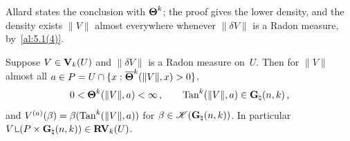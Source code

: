 \begin{remark}
    \label{rem:5.4}
    Allard states the conclusion with $\boldsymbol{\Theta}^{k}$; the proof gives the lower density, and
    the density exists $\|V\|$ almost everywhere whenever $\|\delta V\|$ is a Radon measure,
    by~\ref{al:5.1(4)}.
\end{remark}

\begin{theorem}
    \label{al:5.5(1)}
    Suppose $V \in \mathbf{V}_{k}(U)$ and $\|\delta V\|$ is a Radon measure on~$U$. Then for $\|V\|$
    almost all $a \in P = U \cap \{ x : \boldsymbol{\overline{\Theta}}^{k}(\|V\|,x) > 0 \}$,
    \begin{displaymath}
        0 < \boldsymbol{\Theta}^{k}(\|V\|,a) < \infty \,, \qquad \operatorname{Tan}^{k}(\|V\|,a) \in
        \mathbf{G}_{\natural}(n,k) \,,
    \end{displaymath}
    and $V^{(a)}(\beta) = \beta(\operatorname{Tan}^{k}(\|V\|,a))$ for $\beta \in
    \mathscr{K}(\mathbf{G}_{\natural}(n,k))$.
    In particular $V \restrict (P \times \pgrass{\adim}{\vdim}) \in \RVar{\vdim}(U)$.
\end{theorem}

